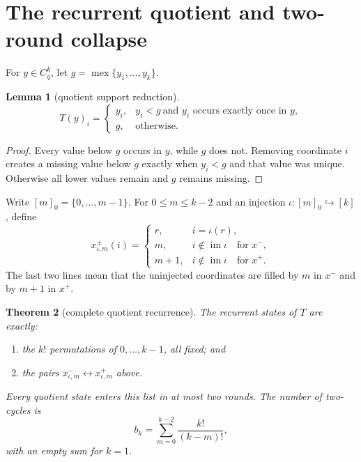 \documentclass[11pt,a4paper]{amsart}
\newtheorem{theorem}{Theorem}[section]
\newtheorem{lemma}[theorem]{Lemma}
\theoremstyle{definition}
\theoremstyle{remark}
\newcommand{\mex}{\operatorname{mex}}
\newcommand{\Cq}{C_q}
\begin{document}
\section{The recurrent quotient and two-round collapse}

For \(y\in\Cq^k\), let \(g=\mex\{y_1,\ldots,y_k\}\).

\begin{lemma}[quotient support reduction]\label{lem:Tformula}
\[
 T(y)_i=
 \begin{cases}
 y_i,&y_i<g\ \text{and \(y_i\) occurs exactly once in \(y\)},\\
 g,&\text{otherwise}.
 \end{cases}
\]
\end{lemma}

\begin{proof}
Every value below \(g\) occurs in \(y\), while \(g\) does not.  Removing
coordinate \(i\) creates a missing value below \(g\) exactly when \(y_i<g\)
and that value was unique.  Otherwise all lower values remain and \(g\)
remains missing.
\end{proof}

Write \([m]_0=\{0,\ldots,m-1\}\).  For
\(0\le m\le k-2\) and an injection
\(\iota:[m]_0\hookrightarrow[k]\), define
\[
 x^\pm_{\iota,m}(i)=
 \begin{cases}
 r,&i=\iota(r),\\
 m,&i\notin\operatorname{im}\iota\quad\text{for }x^-,\\
 m+1,&i\notin\operatorname{im}\iota\quad\text{for }x^+.
 \end{cases}
\]
The last two lines mean that the uninjected coordinates are filled by
\(m\) in \(x^-\) and by \(m+1\) in \(x^+\).

\begin{theorem}[complete quotient recurrence]\label{thm:quotient}
The recurrent states of \(T\) are exactly:
\begin{enumerate}
\item the \(k!\) permutations of \(0,\ldots,k-1\), all fixed; and
\item the pairs \(x^-_{\iota,m}\leftrightarrow x^+_{\iota,m}\) above.
\end{enumerate}
Every quotient state enters this list in at most two rounds.  The number of
two-cycles is
\[
                  b_k=\sum_{m=0}^{k-2}\frac{k!}{(k-m)!},
\]
with an empty sum for \(k=1\).
\end{theorem}
\end{document}
